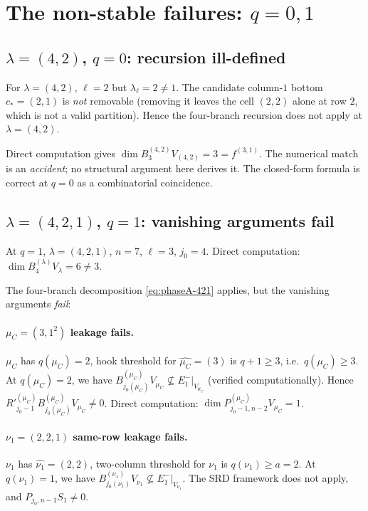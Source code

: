 \documentclass[11pt]{article}
\theoremstyle{definition}
\begin{document}
\section{The non-stable failures: $q = 0, 1$}\label{sec:non-stable}

\subsection{$\lambda = (4, 2)$, $q = 0$: recursion ill-defined}

For $\lambda = (4, 2)$, $\ell = 2$ but $\lambda_\ell = 2 \ne 1$. The
candidate column-$1$ bottom $c_* = (2, 1)$ is \emph{not} removable
(removing it leaves the cell $(2, 2)$ alone at row $2$, which is not a
valid partition). Hence the four-branch recursion does not apply at
$\lambda = (4, 2)$.

Direct computation gives $\dim B^{(4, 2)}_{3} V_{(4, 2)} = 3 = f^{(3, 1)}$.
The numerical match is an \emph{accident}; no structural argument here
derives it. The closed-form formula is correct at $q = 0$ as a
combinatorial coincidence.

\subsection{$\lambda = (4, 2, 1)$, $q = 1$: vanishing arguments fail}

At $q = 1$, $\lambda = (4, 2, 1)$, $n = 7$, $\ell = 3$, $j_0 = 4$.
Direct computation: $\dim B^{(\lambda)}_4 V_\lambda = 6 \ne 3$.

The four-branch decomposition \eqref{eq:phaseA-421} applies, but the
vanishing arguments \emph{fail}:

\paragraph{$\mu_C = (3, 1^2)$ leakage fails.}
$\mu_C$ has $q(\mu_C) = 2$, hook threshold for $\widehat{\mu_C} = (3)$
is $q + 1 \ge 3$, i.e.\ $q(\mu_C) \ge 3$. At $q(\mu_C) = 2$, we have
$B^{(\mu_C)}_{j_0(\mu_C)} V_{\mu_C} \not\subseteq E_1^-|_{V_{\mu_C}}$
(verified computationally). Hence
$R'^{(\mu_C)}_{j_0 - 1} B^{(\mu_C)}_{j_0(\mu_C)} V_{\mu_C} \ne 0$.
Direct computation: $\dim P^{(\mu_C)}_{j_0 - 1, n - 2} V_{\mu_C} = 1$.

\paragraph{$\nu_1 = (2, 2, 1)$ same-row leakage fails.}
$\nu_1$ has $\widehat{\nu_1} = (2, 2)$, two-column threshold for
$\nu_1$ is $q(\nu_1) \ge a = 2$. At $q(\nu_1) = 1$, we have
$B^{(\nu_1)}_{j_0(\nu_1)} V_{\nu_1} \not\subseteq E_1^-|_{V_{\nu_1}}$.
The SRD framework does not apply, and $P_{j_0, n-1} S_1 \ne 0$.
\end{document}

